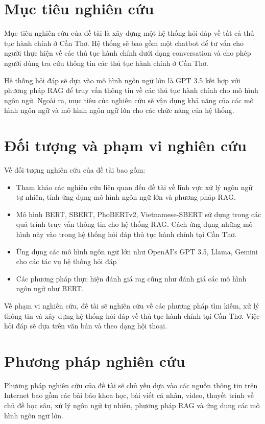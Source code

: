 \documentclass[a4paper, 12pt, openany]{book}
\begin{document}
\section{Mục tiêu nghiên cứu}

Mục tiêu nghiên cứu của đề tài là xây dựng một hệ thống hỏi đáp về tất cả thủ tục hành chính ở Cần Thơ.
Hệ thống sẽ bao gồm một chatbot để tư vấn cho người thực hiện về các thủ tục hành chính dưới dạng conversation và cho 
phép người dùng tra cứu thông tin các thủ tục hành chính ở Cần Thơ.

Hệ thống hỏi đáp sẽ dựa vào mô hình ngôn ngữ lớn là GPT 3.5 kết hợp với phương pháp RAG
để truy vấn thông tin về các thủ tục hành chính cho mô hình ngôn ngữ. Ngoài ra, mục tiêu của nghiên cứu sẽ 
vận dụng khả năng của các mô hình ngôn ngữ và mô hình ngôn ngữ lớn cho các chức năng của hệ thống.

\section{Đối tượng và phạm vi nghiên cứu}

Về đối tượng nghiên cứu của đề tài bao gồm:
\begin{itemize}
    \item Tham khảo các nghiên cứu liên quan đến đề tài về lĩnh vực xử lý ngôn ngữ tự nhiên, tính ứng dụng mô hình ngôn ngữ lớn và phương pháp RAG.
    \item Mô hình BERT, SBERT, PhoBERTv2, Vietnamese-SBERT sử dụng trong các quá trình truy vấn thông tin cho hệ thống RAG. Cách ứng dụng những mô hình này vào trong hệ thống hỏi đáp thủ tục hành chính tại Cần Thơ.
    \item Ứng dụng các mô hình ngôn ngữ lớn như OpenAI's GPT 3.5, Llama, Gemini cho các tác vụ hệ thống hỏi đáp
    \item Các phương pháp thực hiện đánh giá \acl{rag} cũng như đánh giá các mô hình ngôn ngữ như BERT.
\end{itemize}

Về phạm vi nghiên cứu, đề tài sẽ nghiên cứu về các phương pháp tìm kiếm, xử lý thông tin và
xây dựng hệ thống hỏi đáp về thủ tục hành chính tại Cần Thơ. Việc hỏi đáp sẽ dựa trên văn bản 
và theo dạng hội thoại.

\section{Phương pháp nghiên cứu}

Phương pháp nghiên cứu của đề tài sẽ chủ yếu dựa vào các nguồn thông tin trên Internet bao gồm các bài báo khoa học,
bài viết cá nhân, video, thuyết trình về chủ đề học sâu, xử lý ngôn ngữ tự nhiên, phương pháp RAG và ứng dụng các mô hình ngôn ngữ lớn.
\end{document}
